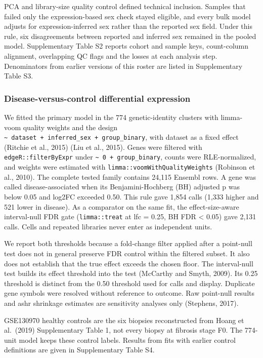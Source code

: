 PCA and library-size quality control defined technical inclusion. Samples that failed only the expression-based sex check stayed eligible, and every bulk model adjusts for expression-inferred sex rather than the reported sex field. Under this rule, six disagreements between reported and inferred sex remained in the pooled model. Supplementary Table S2 reports cohort and sample keys, count-column alignment, overlapping QC flags and the losses at each analysis step. Denominators from earlier versions of this roster are listed in Supplementary Table S3.

\subsubsection{Disease-versus-control differential expression}\label{disease-versus-control-differential-expression}

We fitted the primary model in the 774 genetic-identity clusters with limma-voom quality weights and the design \texttt{\textasciitilde{}\ dataset\ +\ inferred\_\allowbreak{}sex\ +\ group\_\allowbreak{}binary}, with dataset as a fixed effect (Ritchie et al., 2015) (Liu et al., 2015). Genes were filtered with \texttt{edgeR::filterByExpr} under \texttt{\textasciitilde{}\ 0\ +\ group\_\allowbreak{}binary}, counts were RLE-normalized, and weights were estimated with \texttt{limma::voomWithQualityWeights} (Robinson et al., 2010). The complete tested family contains 24,115 Ensembl rows. A gene was called disease-associated when its Benjamini-Hochberg (BH) adjusted p was below 0.05 and \textbar log2FC\textbar{} exceeded 0.50. This rule gave 1,854 calls (1,333 higher and 521 lower in disease). As a comparator on the same fit, the effect-size-aware interval-null FDR gate (\texttt{limma::treat} at lfc = 0.25, BH FDR \textless{} 0.05) gave 2,131 calls. Cells and repeated libraries never enter as independent units.

We report both thresholds because a fold-change filter applied after a point-null test does not in general preserve FDR control within the filtered subset. It also does not establish that the true effect exceeds the chosen floor. The interval-null test builds its effect threshold into the test (McCarthy and Smyth, 2009). Its 0.25 threshold is distinct from the 0.50 threshold used for calls and display. Duplicate gene symbols were resolved without reference to outcome. Raw point-null results and ashr shrinkage estimates are sensitivity analyses only (Stephens, 2017).

GSE130970 healthy controls are the six biopsies reconstructed from Hoang et al.~(2019) Supplementary Table 1, not every biopsy at fibrosis stage F0. The 774-unit model keeps these control labels. Results from fits with earlier control definitions are given in Supplementary Table S4.

